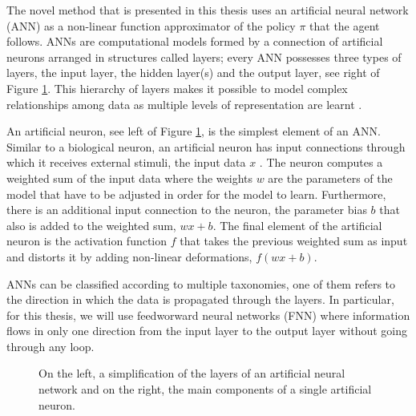 The novel method that is presented in this thesis uses an artificial neural network (ANN) as a non-linear function approximator of the policy $\pi$ that the agent follows. ANNs are computational models formed by a connection of artificial neurons arranged in structures called layers; every ANN possesses three types of layers, the input layer, the hidden layer(s) and the output layer, see right of Figure \ref{fig:nn}. This hierarchy of layers makes it possible to model complex relationships among data as multiple levels of representation are learnt \cite{ANNs}.




An artificial neuron, see left of Figure \ref{fig:nn}, is the simplest element of an ANN. Similar to a biological neuron, an artificial neuron has input connections through which it receives external stimuli, the input data $x$ \cite{ANN-graupe:2013}. The neuron computes a weighted sum of the input data where the weights $w$ are the parameters of the model that have to be adjusted in order for the model to learn. Furthermore, there is an additional input connection to the neuron, the parameter bias $b$ that also is added to the weighted sum, $wx + b$. The final element of the artificial neuron is the activation function $f$ that takes the previous weighted sum as input and distorts it by adding non-linear deformations, $f(wx + b)$.



ANNs can be classified according to multiple taxonomies, one of them refers to the direction in which the data is propagated through the layers. In particular, for this thesis, we will use feedworward neural networks (FNN) where information flows in only one direction from the input layer to the output layer without going through any loop.

  
  
  
   \begin{figure}[H]
  \centering
  \subfloat{{%
  }}
   \hfill
  \subfloat{{%
  }}

  \caption{On the left, a simplification of the layers of an artificial neural network and on the right, the main components of a single artificial neuron.}
  \label{fig:nn}
\end{figure}
















